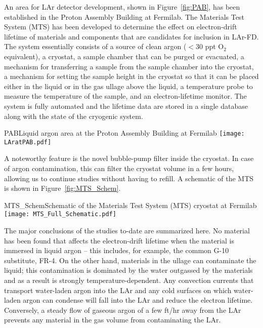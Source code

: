 An area for LAr detector development, shown in Figure~\ref{fig:PAB}, has been established in the Proton Assembly Building at Fermilab. The Materials Test System (MTS) has been developed to determine the effect on electron-drift lifetime of materials and components that are candidates for 
inclusion in LAr-FD. The system essentially consists 
of a source of clean argon ($<30$ ppt O$_{2}$ equivalent), a cryostat, a sample chamber that can be purged or evacuated,  a mechanism for transferring a sample from the sample chamber into the cryostat, a mechanism for setting the sample height in the cryostat so that it can be placed either in the liquid or in the gas ullage above the liquid, a temperature probe to measure the temperature of the sample, and an electron-lifetime monitor. The system is fully automated and the lifetime data are stored in a single database along with the state of the cryogenic system. 

\begin{cdrfigure}{PAB}{Liquid argon area at the Proton Assembly Building at Fermilab}
\texttt{[image: LAratPAB.pdf]}
\end{cdrfigure}
%

A noteworthy feature is the novel bubble-pump filter inside the cryostat. In case of argon contamination, this can filter the cryostat volume in a few hours, allowing us to continue studies %
 without having to refill. A schematic of the MTS is shown in Figure~\ref{fig:MTS_Schem}.

\begin{cdrfigure}{MTS_Schem}{Schematic of the Materials Test System (MTS) cryostat at Fermilab}
\texttt{[image: MTS\_Full\_Schematic.pdf]}
\end{cdrfigure}

The major conclusions of the studies to-date  are summarized here. No material has been found that affects the electron-drift lifetime when the material is immersed in liquid argon -- this includes, for example, the common G-10 substitute, FR-4. On the other hand, materials in the ullage can contaminate the liquid; this contamination is dominated by the water outgassed by the materials and as a result is strongly temperature-dependent. Any convection currents that transport water-laden argon into the LAr and any cold surfaces on which water-laden argon can condense will fall into the LAr and reduce the electron lifetime. Conversely,  a steady flow of gaseous argon of a few ft/hr away from the LAr prevents any material in the gas volume from contaminating the LAr. 


